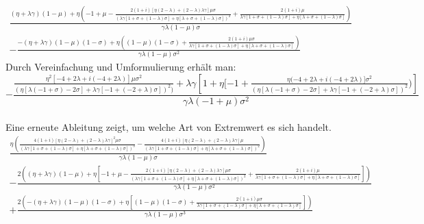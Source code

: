 \begin{equation}
\begin{split}
\frac{(\eta + \lambda \gamma) (1-\mu)+ \eta\left(-1+ \mu - \frac{2(1+ i)[\eta(2- \lambda)+(2- \lambda) \lambda \gamma] \mu  \sigma}{(\lambda \gamma[1+ \sigma + ( 1 - \lambda) \sigma] +\eta [\lambda + \sigma + (1- \lambda)\sigma])^{2}} + \frac{2(1+i)\mu}{\lambda \gamma [1+ \sigma + (1- \lambda)\sigma]+ \eta[\lambda+ \sigma +(1- \lambda) \sigma]}\right)} {\gamma \lambda(1- \mu) \sigma}\\
- \frac{-(\eta + \lambda \gamma)(1 -  \mu)(1- \sigma)+ \eta\left((1- \mu)(1- \sigma)+ \frac{2(1+i) \mu \sigma}{\lambda \gamma [1+ \sigma + (1- \lambda) \sigma ]+\eta[ \lambda + \sigma + (1- \lambda) \sigma]}\right) } {\gamma \lambda (1- \mu) \sigma^{2}}
\end{split}
\end{equation}
Durch Vereinfachung und Umformulierung erhält man:
\\
\begin{equation}
- \frac{\frac{\eta^{2}[-4 +2\lambda + i(-4 + 2\lambda)]\mu\sigma^{2}}{\left(\eta[\lambda(-1 + \sigma)- 2\sigma]+\lambda\gamma[-1+(-2+\lambda)\sigma]\right)^{2})} + \lambda \gamma \left[1 + \eta [-1 + \frac{\eta (-4+2\lambda + i (-4+2 \lambda)] \sigma^{2}} {(\eta [ \lambda (-1+ \sigma)- 2\sigma]+ \lambda \gamma [-1+ (-2+ \lambda) \sigma])^{2}})\right] }{\gamma \lambda (-1 + \mu) \sigma^{2}}
\end{equation}
\\
Eine erneute Ableitung zeigt, um welche Art von Extremwert es sich handelt.\\
\begin{equation}
\begin{split}
\frac{\eta\left(\frac{4 (1+ i)[\eta(2- \lambda)+ (2- \lambda) \lambda \gamma]^{2} \mu \sigma}{\left(\lambda \gamma[1 + \sigma + (1 - \lambda) \sigma] + \eta [\lambda + \sigma + (1- \lambda)\sigma]\right)^{3}}- \frac{4(1+i)[\eta ( 2- \lambda)+ (2- \lambda) \lambda \gamma] \mu}{\left(\lambda \gamma [1+ \sigma + (1- \lambda) \sigma] + \eta [\lambda + \sigma + (1- \lambda) \sigma]\right)^{2}}\right)}{\gamma \lambda (1- \mu) \sigma}\\
-\frac{2\left((\eta +\lambda\gamma)(1-\mu)+\eta\left[-1+\mu-\frac{2(1+i) [\eta (2- \lambda)+(2-\lambda)\lambda \gamma]\mu\sigma}{\left(\lambda \gamma [1+\sigma+(1-\lambda)\sigma] +\eta[\lambda+\sigma +(1-\lambda)\sigma]\right)^{2}}+\frac{2(1+i)\mu}{\lambda\gamma[1+\sigma+(1-\lambda)\sigma]+\eta[\lambda+\sigma+(1-\lambda)\sigma]}\right]\right)}{\gamma\lambda(1-\mu)\sigma^{2}}\\
+\frac{2\left(-(\eta+\lambda \gamma)(1- \mu)(1- \sigma) +\eta\left[(1-\mu)(1-\sigma)+\frac{2 (1+i)\mu\sigma}{\lambda \gamma[1+\sigma + (1-\lambda)\sigma] +\eta[\lambda+\sigma+(1- \lambda)\sigma]}\right]\right)}{\gamma\lambda(1-\mu)\sigma^3}
\end{split}
\end{equation}
